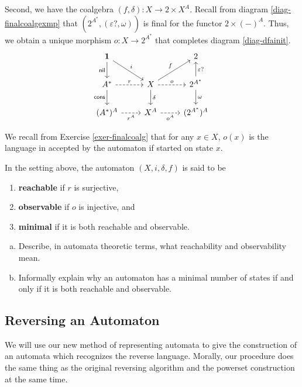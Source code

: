 \documentclass[main.tex]{subfiles}
\begin{document}
Second, we have the coalgebra $(f,\delta): X \rightarrow 2 \times X^{A}$. Recall from diagram \ref{diag-finalcoalgexmp} that $(2^{A^*}, (\varepsilon?, \omega))$ is final for the functor $2\times (-)^A$. Thus, we obtain a unique morphism $o:X \rightarrow 2^{A^*}$ that completes diagram \ref{diag-dfainit}.
\begin{equation}\label{diag-dfainitfinal}
	\begin{tikzcd}
 \mathbf{1} \arrow[rd, "i"] \arrow[d, "\textsf{nil}"'] & & 2 \\
 A^* \arrow[d, "\textsf{cons}"'] \arrow[r, "r", dashed] & X \arrow[d, "\delta"] \arrow[ru, "f"] \arrow[r, "o", dashed] & 2^{A^*} \arrow[u, "\varepsilon?"'] \arrow[d, "\omega"] \\
 (A^*)^A \arrow[r, "r^A"', dashed] & X^A \arrow[r, "o^A"', dashed] & (2^{A^*})^A 
 \end{tikzcd}
\end{equation}

We recall from Exercise \ref{exer-finalcoalg} that for any $x \in X$, $o(x)$ is the language in accepted by the automaton if started on state $x$.

\begin{defn}
	In the setting above, the automaton $(X,i, \delta,f)$ is said to be
	\begin{enumerate}
		\item \textbf{reachable} if $r$ is surjective,
		\item \textbf{observable} if $o$ is injective, and
		\item \textbf{minimal} if it is both reachable and observable.
	\end{enumerate}
\end{defn}
\begin{exer}[1pts]
    \begin{enumerate}[(a)]
        \item Describe, in automata theoretic terms, what reachability and observability mean.
        \item Informally explain why an automaton has a minimal number of states if and only if it is both reachable and observable.
    \end{enumerate}
\end{exer}

\subsection{Reversing an Automaton}
We will use our new method of representing automata to give the construction of an automata which recognizes the reverse language. Morally, our procedure does the same thing as the original reversing algorithm and the powerset construction at the same time.
\end{document}
